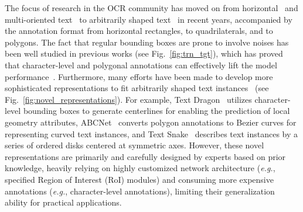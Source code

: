 \documentclass[sigconf]{acmart}
\begin{document}
The focus of research in the OCR community has moved on from horizontal~\cite{tian2016detecting, liao2017textboxes} and multi-oriented text~\cite{zhou2017east, yao2012detecting,liu2017deep} to arbitrarily shaped text~\cite{liu2020abcnet, lyu2018mask} in recent years, accompanied by the annotation format from horizontal rectangles, to quadrilaterals, and to polygons. The fact that regular bounding boxes are prone to involve noises has been well studied in previous works (see Fig.~\ref{fig:trn_tgt}), which has proved that character-level and polygonal annotations can effectively lift the model performance~\cite{lyu2018mask, liao2020masktext, xing2019convolutional}. Furthermore, many efforts have been made to develop more sophisticated representations to fit arbitrarily shaped text instances~\cite{feng2019textdragon, wang2020textray, liu2020abcnet, zhu2021fourier, long2018textsnake} (see Fig.~\ref{fig:novel_representations}). For example, Text Dragon~\cite{feng2019textdragon} utilizes character-level bounding boxes to generate centerlines for enabling the prediction of local geometry attributes, ABCNet~\cite{liu2020abcnet} converts polygon annotations to Bezier curves for representing curved text instances, and Text Snake~\cite{long2018textsnake} describes text instances by a series of ordered disks centered at symmetric axes. However, these novel representations are primarily and carefully designed by experts based on prior knowledge, heavily relying on highly customized network architecture (\emph{e.g.}, specified Region of Interest (RoI) modules) and consuming more expensive annotations (\emph{e.g.}, character-level annotations), limiting their generalization ability for practical applications. 
\end{document}
